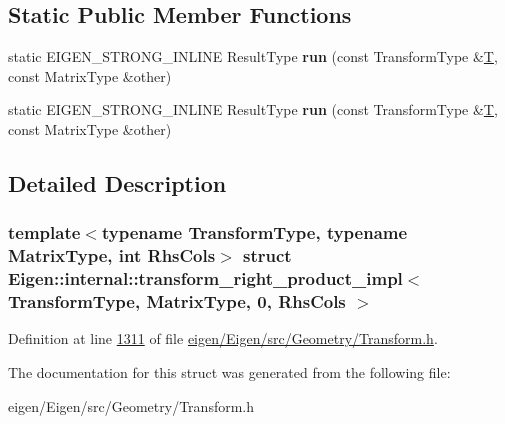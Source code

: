 \subsection*{Static Public Member Functions}
\begin{DoxyCompactItemize}
\item 
\mbox{\label{struct_eigen_1_1internal_1_1transform__right__product__impl_3_01_transform_type_00_01_matrix_type_00_010_00_01_rhs_cols_01_4_a262c9cb7c69f651ee2f17a5c66328d99}} 
static E\+I\+G\+E\+N\+\_\+\+S\+T\+R\+O\+N\+G\+\_\+\+I\+N\+L\+I\+NE Result\+Type {\bfseries run} (const Transform\+Type \&\hyperlink{group___sparse_core___module}{T}, const Matrix\+Type \&other)
\item 
\mbox{\label{struct_eigen_1_1internal_1_1transform__right__product__impl_3_01_transform_type_00_01_matrix_type_00_010_00_01_rhs_cols_01_4_a262c9cb7c69f651ee2f17a5c66328d99}} 
static E\+I\+G\+E\+N\+\_\+\+S\+T\+R\+O\+N\+G\+\_\+\+I\+N\+L\+I\+NE Result\+Type {\bfseries run} (const Transform\+Type \&\hyperlink{group___sparse_core___module}{T}, const Matrix\+Type \&other)
\end{DoxyCompactItemize}


\subsection{Detailed Description}
\subsubsection*{template$<$typename Transform\+Type, typename Matrix\+Type, int Rhs\+Cols$>$\newline
struct Eigen\+::internal\+::transform\+\_\+right\+\_\+product\+\_\+impl$<$ Transform\+Type, Matrix\+Type, 0, Rhs\+Cols $>$}



Definition at line \hyperlink{eigen_2_eigen_2src_2_geometry_2_transform_8h_source_l01311}{1311} of file \hyperlink{eigen_2_eigen_2src_2_geometry_2_transform_8h_source}{eigen/\+Eigen/src/\+Geometry/\+Transform.\+h}.



The documentation for this struct was generated from the following file\+:\begin{DoxyCompactItemize}
\item 
eigen/\+Eigen/src/\+Geometry/\+Transform.\+h\end{DoxyCompactItemize}
